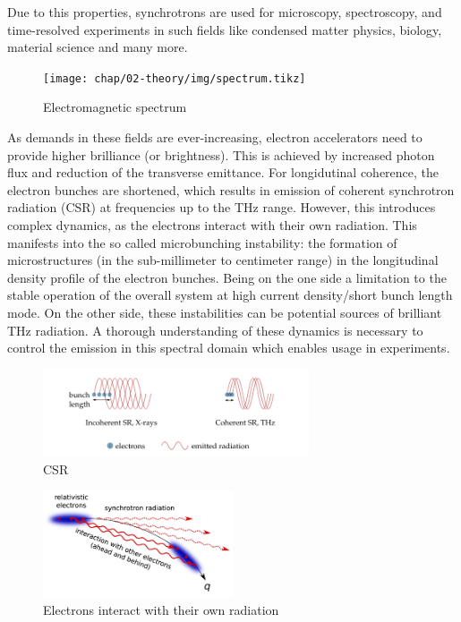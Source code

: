 Due to this properties, synchrotrons are used for microscopy, spectroscopy, and time-resolved experiments in such fields like condensed matter physics, biology, material science and many more. 
\begin{figure}[H]
	\centering
	\texttt{[image: chap/02-theory/img/spectrum.tikz]}
	\caption{Electromagnetic spectrum}
	\label{fig:spectrum}
\end{figure}
As demands in these fields are ever-increasing, electron accelerators need to provide higher brilliance (or brightness). This is achieved by increased photon flux and reduction of the transverse emittance. For longidutinal coherence, the electron bunches are shortened, which results in emission of coherent synchrotron radiation (CSR) at frequencies up to the THz range. However, this introduces complex dynamics, as the electrons interact with their own radiation. This manifests into the so called microbunching instability: the formation of microstructures (in the sub-millimeter to centimeter range) in the longitudinal density profile of the electron bunches. Being on the one side a limitation to the stable operation of the overall system at high current density/short bunch length mode. On the other side, these instabilities can be potential sources of brilliant THz radiation. A thorough understanding of these dynamics is necessary to control the emission in this spectral domain which enables usage in experiments. \cite{rota2018} \cite{brosi}

\begin{figure}[H]
	\centering
	\includegraphics[width = 0.7\textwidth]{chap/02-theory/img/csr2.png}
	\caption{CSR \cite{rota2018}}
	\label{fig:csr}
\end{figure}

\begin{figure}[H]
	\centering
	\includegraphics[width = 0.5\textwidth]{chap/02-theory/img/microbunching}
	\caption{Electrons interact with their own radiation \cite{Bielawski2019}}
	\label{fig:microBunch}
\end{figure}










